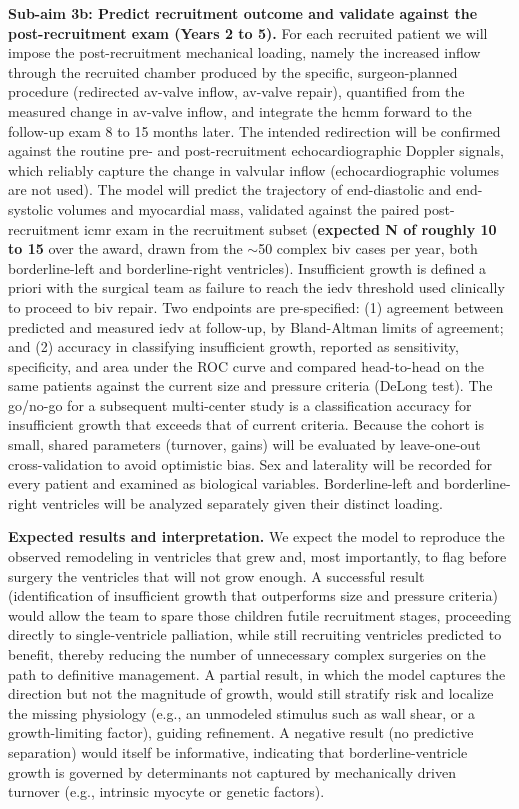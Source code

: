 \textbf{Sub-aim 3b: Predict recruitment outcome and validate against the post-recruitment exam (Years 2 to 5).} For each recruited patient we will impose the post-recruitment mechanical loading, namely the increased inflow through the recruited chamber produced by the specific, surgeon-planned procedure (redirected \gls*{av}-valve inflow, \gls*{av}-valve repair), quantified from the measured change in \gls*{av}-valve inflow, and integrate the \gls*{hcmm} forward to the follow-up exam 8 to 15 months later. The intended redirection will be confirmed against the routine pre- and post-recruitment echocardiographic Doppler signals, which reliably capture the change in valvular inflow (echocardiographic volumes are not used). The model will predict the trajectory of end-diastolic and end-systolic volumes and myocardial mass, validated against the paired post-recruitment \gls*{icmr} exam in the recruitment subset (\textbf{expected N of roughly 10 to 15} over the award, drawn from the $\sim$50 complex \gls*{biv} cases per year, both borderline-left and borderline-right ventricles). Insufficient growth is defined a priori with the surgical team as failure to reach the \gls*{iedv} threshold used clinically to proceed to \gls*{biv} repair. Two endpoints are pre-specified: (1) agreement between predicted and measured \gls*{iedv} at follow-up, by Bland-Altman limits of agreement; and (2) accuracy in classifying insufficient growth, reported as sensitivity, specificity, and area under the ROC curve and compared head-to-head on the same patients against the current size and pressure criteria (DeLong test). The go/no-go for a subsequent multi-center study is a classification accuracy for insufficient growth that exceeds that of current criteria. Because the cohort is small, shared parameters (turnover, gains) will be evaluated by leave-one-out cross-validation to avoid optimistic bias. Sex and laterality will be recorded for every patient and examined as biological variables. Borderline-left and borderline-right ventricles will be analyzed separately given their distinct loading.

\textbf{Expected results and interpretation.} We expect the model to reproduce the observed remodeling in ventricles that grew and, most importantly, to flag before surgery the ventricles that will not grow enough. A successful result (identification of insufficient growth that outperforms size and pressure criteria) would allow the team to spare those children futile recruitment stages, proceeding directly to single-ventricle palliation, while still recruiting ventricles predicted to benefit, thereby reducing the number of unnecessary complex surgeries on the path to definitive management. A partial result, in which the model captures the direction but not the magnitude of growth, would still stratify risk and localize the missing physiology (e.g., an unmodeled stimulus such as wall shear, or a growth-limiting factor), guiding refinement. A negative result (no predictive separation) would itself be informative, indicating that borderline-ventricle growth is governed by determinants not captured by mechanically driven turnover (e.g., intrinsic myocyte or genetic factors).

